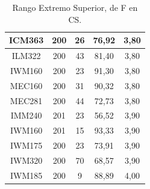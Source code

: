\documentclass[12pt]{article}
\begin{document}
\begin{table}[H]
{{\begin{minipage}[b]{.5\hsize}
\begin{tabular}{|c|c|c|c|c|}
            ICM363 & 200 & 26 & 76,92 & 3,80 \\ \hline
            \rowcolor[HTML]{DAEBFB} 
            ILM322 & 200 & 43 & 81,40 & 3,80 \\ \hline
            \rowcolor[HTML]{DAEBFB} 
            IWM160 & 200 & 23 & 91,30 & 3,80 \\ \hline
            \rowcolor[HTML]{DAEBFB} 
            MEC160 & 200 & 31 & 90,32 & 3,80 \\ \hline
            \rowcolor[HTML]{DAEBFB} 
            MEC281 & 200 & 44 & 72,73 & 3,80 \\ \hline
            \rowcolor[HTML]{DAEBFB} 
            IMM240 & 201 & 23 & 56,52 & 3,90 \\ \hline
            \rowcolor[HTML]{DAEBFB} 
            IWM160 & 201 & 15 & 93,33 & 3,90 \\ \hline
            \rowcolor[HTML]{DAEBFB} 
            IWM175 & 200 & 23 & 73,91 & 3,90 \\ \hline
            \rowcolor[HTML]{DAEBFB} 
            IWM320 & 200 & 70 & 68,57 & 3,90 \\ \hline
            \rowcolor[HTML]{DAEBFB} 
            IWM185 & 200 & 9 & 88,89 & 4,00 \\ \hline
        \end{tabular}
        \caption{Rango Extremo Superior, de F en CS.}
    \end{minipage}\hfil
    \hfill
    \begin{minipage}[b]{.5\hsize}\centering
\end{minipage}}}
\end{table}
\end{document}
